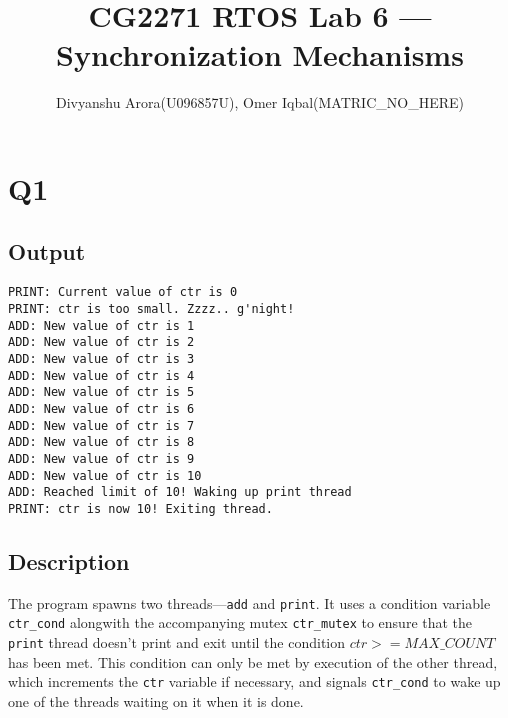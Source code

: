\documentclass[runningheads,a4paper]{report}
\title{CG2271 RTOS Lab 6 --- Synchronization Mechanisms}
\author{Divyanshu Arora(U096857U), Omer Iqbal(MATRIC\_NO\_HERE)}
\begin{document}
\maketitle
\section*{Q1}
\subsection*{Output}
\begin{lstlisting}
PRINT: Current value of ctr is 0
PRINT: ctr is too small. Zzzz.. g'night!
ADD: New value of ctr is 1
ADD: New value of ctr is 2
ADD: New value of ctr is 3
ADD: New value of ctr is 4
ADD: New value of ctr is 5
ADD: New value of ctr is 6
ADD: New value of ctr is 7
ADD: New value of ctr is 8
ADD: New value of ctr is 9
ADD: New value of ctr is 10
ADD: Reached limit of 10! Waking up print thread
PRINT: ctr is now 10! Exiting thread.
\end{lstlisting}

\subsection*{Description}

The program spawns two threads---\texttt{add} and \texttt{print}. It
uses a condition variable \texttt{ctr\_cond} alongwith the
accompanying mutex \texttt{ctr\_mutex} to ensure that the
\texttt{print} thread doesn't print and exit until the condition
$ctr>=MAX\_COUNT$ has been met.
This condition can only be met by execution of the other thread, which
increments the \texttt{ctr} variable if necessary, and signals
\texttt{ctr\_cond} to wake up one of the threads waiting on it when it
is done.
\end{document}
